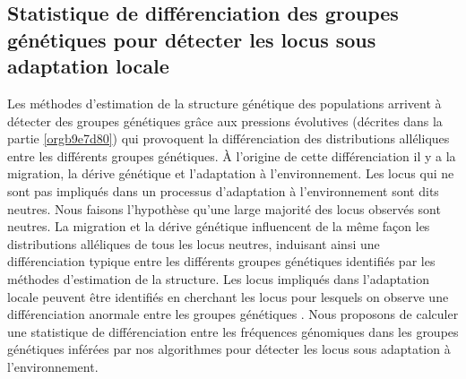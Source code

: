 \documentclass[12pt,a4paper,twoside]{ugathesis}
\begin{document}
\subsection{Statistique de différenciation des groupes génétiques pour détecter les locus sous adaptation locale}
\label{sec:orged1e408}

Les méthodes d'estimation de la structure génétique des populations arrivent à
détecter des groupes génétiques grâce aux pressions évolutives (décrites dans
la partie \ref{orgb9e7d80}) qui provoquent la différenciation des distributions
alléliques entre les différents groupes génétiques. À l'origine de cette
différenciation il y a la migration, la dérive génétique et l'adaptation à
l'environnement. Les locus qui ne sont pas impliqués dans un processus
d'adaptation à l'environnement sont dits neutres. Nous faisons l'hypothèse
qu'une large majorité des locus observés sont neutres. La migration et la dérive
génétique influencent de la même façon les distributions alléliques de tous les
locus neutres, induisant ainsi une différenciation typique entre les différents
groupes génétiques identifiés par les méthodes d'estimation de la structure.
Les locus impliqués dans l'adaptation locale peuvent être identifiés en
cherchant les locus pour lesquels on observe une différenciation anormale entre
les groupes génétiques \citep{Lewontin175}. Nous proposons de calculer une
statistique de différenciation entre les fréquences génomiques dans les groupes
génétiques inférées par nos algorithmes pour détecter les locus sous adaptation
à l'environnement.
\end{document}
